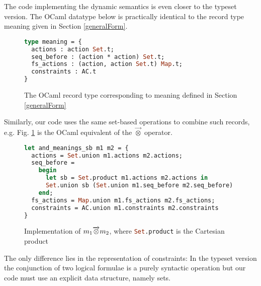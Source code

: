 \documentclass[a4paper,12pt]{scrbook}
\theoremstyle{plain}
\theoremstyle{definition}
\newcommand{\sem}[1]{{\small{\textsf{#1}}}}
\newcommand{\sband}[0]{\overrightarrow\otimes}
\begin{document}
The code implementing the dynamic semantics is even closer to the typeset
version. The OCaml datatype below is practically identical to the record type
\sem{meaning} given in Section \ref{generalForm}.
\begin{figure}[htb]
\begin{lstlisting}[language=ML, frame=tblr]
type meaning = {
  actions : action Set.t;
  seq_before : (action * action) Set.t;
  fs_actions : (action, action Set.t) Map.t;
  constraints : AC.t
}
\end{lstlisting}
\caption{The OCaml record type corresponding to \sem{meaning} defined in Section \ref{generalForm}}
\end{figure}

Similarly, our code uses the same set-based operations to combine such records,
e.g. Fig. \ref{codeSbAnd} is the OCaml equivalent of the $\sband$ operator.
\begin{figure}[htb]
\begin{lstlisting}[language=ML, frame=tblr]
let and_meanings_sb m1 m2 = {
  actions = Set.union m1.actions m2.actions;
  seq_before =
    begin
      let sb = Set.product m1.actions m2.actions in
      Set.union sb (Set.union m1.seq_before m2.seq_before)
    end;
  fs_actions = Map.union m1.fs_actions m2.fs_actions;
  constraints = AC.union m1.constraints m2.constraints
}
\end{lstlisting}
\caption{Implementation of $m_1 \protect\sband m_2$, where
  \lstinline[language=ML]{Set.product} is the Cartesian product}
\label{codeSbAnd}
\end{figure}
The only difference lies in the representation of constraints: In the typeset
version the conjunction of two logical formulae is a purely syntactic operation
but our code must use an explicit data structure, namely sets.
\end{document}

